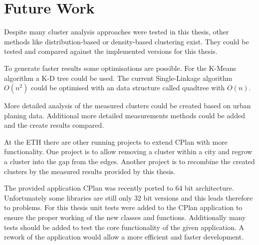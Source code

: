 \chapter{Future Work}
\label{sec:future_work}

Despite many cluster analysis approaches were tested in this thesis, other methods like distribution-based or density-based clustering exist. They could be tested and compared against the implemented versions for this thesis.

To generate faster results some optimisations are possible. For the K-Means algorithm a K-D tree could be used. The current Single-Linkage algorithm $O(n^2)$ could be optimised with an data structure called quadtree with $O(n)$.

More detailed analysis of the measured clusters could be created based on urban planing data. Additional more detailed measurements methods could be added and the create results compared.

At the ETH there are other running projects to extend CPlan with more functionality. One project is to allow removing a cluster within a city and regrow a cluster into the gap from the edges. Another project is to recombine the created clusters by the measured results provided by this thesis.

The provided application CPlan was recently ported to 64 bit architecture. Unfortunately some libraries are still only 32 bit versions and this leads therefore to problems. For this thesis unit tests were added to the CPlan application to ensure the proper working of the new classes and functions. Additionally many tests should be added to test the core functionality of the given application. A rework of the application would allow a more efficient and faster development.